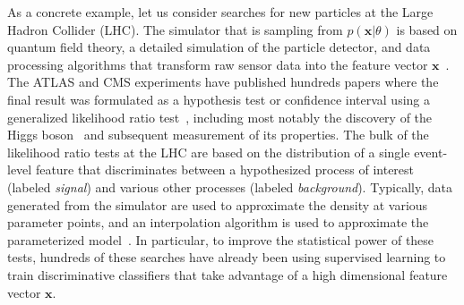 \documentclass[12pt]{article}
\numberwithin{equation}{section}
\theoremstyle{plain}
\begin{document}
As a concrete example, let us consider searches for new particles at the Large
Hadron Collider (LHC). The simulator that is sampling from $p(\mathbf{x}|\theta)$ is
based on quantum field theory, a detailed simulation of the particle detector,
and data processing algorithms that transform raw sensor data into the feature
vector $\mathbf{x}$~\citep{Sjostrand:2006za,Agostinelli:2002hh}. The ATLAS and CMS
experiments have published  hundreds papers where the final result was
formulated as a hypothesis test or confidence interval using a generalized
likelihood ratio test~\citep{Cowan:2010js}, including most notably the discovery
of the Higgs boson~\citep{Aad:2012tfa,Chatrchyan:2012ufa} and subsequent
measurement of its properties. The bulk of the likelihood ratio tests at the LHC
are based on the distribution of a single event-level feature that discriminates
between a hypothesized process of interest (labeled \textit{signal}) and various
other processes (labeled \textit{background}). Typically, data generated from the
simulator are used to approximate the density at various parameter points, and
an interpolation algorithm is used to approximate the parameterized
model~\citep{Cranmer:2012sba}. In particular, to improve the statistical power
of these tests, hundreds of these searches have already been using supervised
learning to train discriminative classifiers that take advantage of a high
dimensional feature vector $\mathbf{x}$.

%
\end{document}
